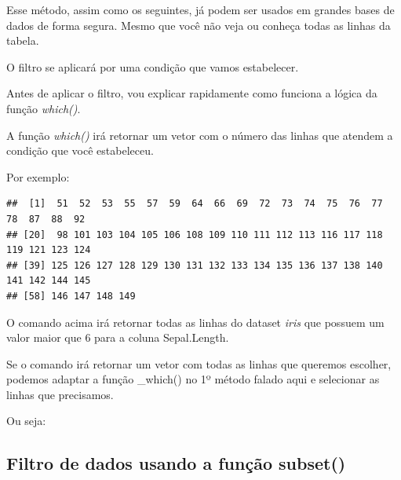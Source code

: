 \documentclass[
]{book}
\newenvironment{Shaded}{\begin{snugshade}}{\end{snugshade}}
\newcommand{\DecValTok}[1]{\textcolor[rgb]{0.00,0.00,0.81}{#1}}
\newcommand{\KeywordTok}[1]{\textcolor[rgb]{0.13,0.29,0.53}{\textbf{#1}}}
\newcommand{\NormalTok}[1]{#1}
\newcommand{\OperatorTok}[1]{\textcolor[rgb]{0.81,0.36,0.00}{\textbf{#1}}}
\begin{document}
Esse método, assim como os seguintes, já podem ser usados em grandes
bases de dados de forma segura. Mesmo que você não veja ou conheça todas
as linhas da tabela.

O filtro se aplicará por uma condição que vamos estabelecer.

Antes de aplicar o filtro, vou explicar rapidamente como funciona a
lógica da função \emph{which()}.

A função \emph{which()} irá retornar um vetor com o número das linhas
que atendem a condição que você estabeleceu.

Por exemplo:

\begin{Shaded}
\end{Shaded}

\begin{verbatim}
##  [1]  51  52  53  55  57  59  64  66  69  72  73  74  75  76  77  78  87  88  92
## [20]  98 101 103 104 105 106 108 109 110 111 112 113 116 117 118 119 121 123 124
## [39] 125 126 127 128 129 130 131 132 133 134 135 136 137 138 140 141 142 144 145
## [58] 146 147 148 149
\end{verbatim}

O comando acima irá retornar todas as linhas do dataset \emph{iris} que
possuem um valor maior que 6 para a coluna Sepal.Length.

Se o comando irá retornar um vetor com todas as linhas que queremos
escolher, podemos adaptar a função \_which() no 1º método falado aqui e
selecionar as linhas que precisamos.

Ou seja:

\begin{Shaded}
\end{Shaded}

\hypertarget{filtro-de-dados-usando-a-funuxe7uxe3o-subset}{%
\subsection{Filtro de dados usando a função
subset()}\label{filtro-de-dados-usando-a-funuxe7uxe3o-subset}}
\end{document}
